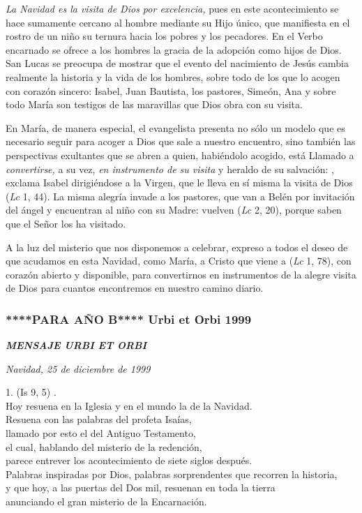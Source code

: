 \emph{La Navidad es la visita de Dios por excelencia,} pues en este acontecimiento se hace sumamente cercano al hombre mediante su Hijo único, que manifiesta en el rostro de un niño su ternura hacia los pobres y los pecadores. En el Verbo encarnado se ofrece a los hombres la gracia de la adopción como hijos de Dios. San Lucas se preocupa de mostrar que el evento del nacimiento de Jesús cambia realmente la historia y la vida de los hombres, sobre todo de los que lo acogen con corazón sincero: Isabel, Juan Bautista, los pastores, Simeón, Ana y sobre todo María son testigos de las maravillas que Dios obra con su visita.

En María, de manera especial, el evangelista presenta no sólo un modelo que es necesario seguir para acoger a Dios que sale a nuestro encuentro, sino también las perspectivas exultantes que se abren a quien, habiéndolo acogido, está Llamado a \emph{convertirse,} a su vez, \emph{en instrumento de su visita} y heraldo de su salvación: , exclama Isabel dirigiéndose a la Virgen, que le lleva en sí misma la visita de Dios (\emph{Lc} 1, 44). La misma alegría invade a los pastores, que van a Belén por invitación del ángel y encuentran al niño con su Madre: vuelven  (\emph{Lc} 2, 20), porque saben que el Señor los ha visitado.

A la luz del misterio que nos disponemos a celebrar, expreso a todos el deseo de que acudamos en esta Navidad, como María, a Cristo que viene a  (\emph{Lc} 1, 78), con corazón abierto y disponible, para convertirnos en instrumentos de la alegre visita de Dios para cuantos encontremos en nuestro camino diario.

\subsubsection{****PARA AÑO B**** Urbi et Orbi 1999} \textbf{\emph{MENSAJE URBI ET ORBI}}

\emph{Navidad, 25 de diciembre de 1999}

 

1.  (Is 9, 5) .\\ Hoy resuena en la Iglesia y en el mundo la  de la Navidad.\\ Resuena con las palabras del profeta Isaías,\\ llamado por esto el  del Antiguo Testamento, \\ el cual, hablando del misterio de la redención,\\ parece entrever los acontecimiento de siete siglos después.\\ Palabras inspiradas por Dios, palabras sorprendentes que recorren la historia, \\ y que hoy, a las puertas del Dos mil, resuenan en toda la tierra\\ anunciando el gran misterio de la Encarnación.

